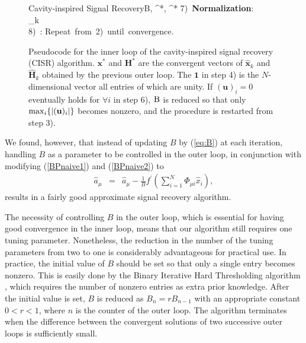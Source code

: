 \documentclass[12pt]{iopart}
\newcommand{\vm}[1]{\boldsymbol{#1}}
\begin{document}
\begin{figure}
\begin{pseudocode}[ruled]{Cavity-inspired Signal Recovery}{\textsc{B}, ^*, ^*}
7)\ \mbox{\bf Normalization}:\\
 \hspace{30pt}_{k}\GETS {} \\

8)\ : \mbox{Repeat from 2) until convergence.}
\end{pseudocode}
\protect
\caption{\protect\label{proposedalgorithm}Pseudocode for the inner loop of the cavity-inspired signal recovery (CISR) algorithm. $\mathbf{x}^*$ and $\mathbf{H}^*$ are the convergent vectors of $\hat{\mathbf{x}}_k$ and $\hat{\mathbf{H}}_k$ obtained by the previous outer loop. The $\vm{1}$ in step 4) is the $N$-dimensional vector all entries of which are unity. If $(\mathbf{u})_i=0$ eventually holds for $\forall{i}$ in step 6), $\textsc{B}$ is reduced so that only $\mathop{\rm max}_{i} \{|(\mathbf{u})_i|\}$ becomes nonzero, and the procedure is restarted from step 3).}
\end{figure}

We found, however, that instead of updating $B$ by (\ref{eq:B}) at each iteration, handling $B$ as a parameter to be controlled in the outer loop, in conjunction with modifying (\ref{BPnaive1}) and (\ref{BPnaive2}) to 
\begin{eqnarray}
\hat{a}_\mu &=& \hat{a}_\mu -\frac{1}{B} f^{\prime}\left (\sum_{i=1}^N \Phi_{\mu i} \hat{x}_i  \right ),   \label{BPnaive2rev}
\end{eqnarray}
results in a fairly good approximate signal recovery algorithm. 

The necessity of controlling $B$ in the outer loop, which is essential for having good convergence in the inner loop, means that our algorithm still requires one tuning parameter. Nonetheless, the reduction in the number of the tuning parameters from two to one is considerably advantageous for practical use. In practice, the initial value of $B$ should be set so that only a single entry becomes nonzero. This is easily done by the Binary Iterative Hard Thresholding algorithm \cite{BIHT}, which requires the number of nonzero entries as extra prior knowledge. After the initial value is set, $B$ is reduced as $B_n=r B_{n-1}$ with an appropriate constant $0<r < 1$, where $n$ is the counter of the outer loop. The algorithm terminates when the difference between the convergent solutions of two successive outer loops is sufficiently small. 
\end{document}
